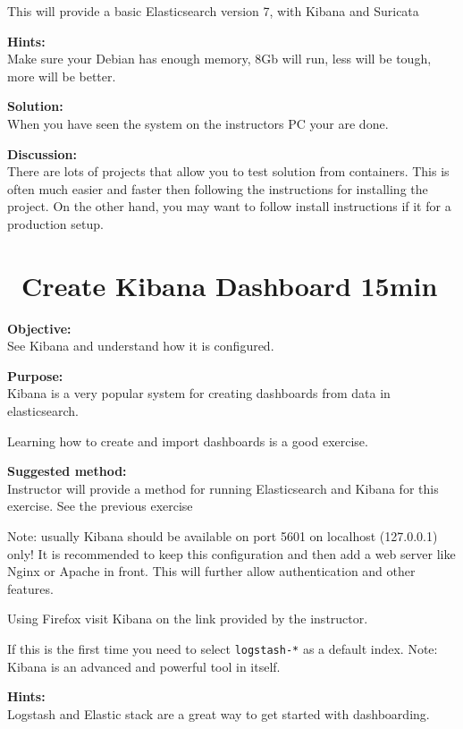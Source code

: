 \documentclass[a4paper,11pt,notitlepage]{report}
\begin{document}
This will provide a basic Elasticsearch version 7, with Kibana and Suricata


{\bf Hints:}\\
Make sure your Debian has enough memory, 8Gb will run, less will be tough, more will be better.

{\bf Solution:}\\
When you have seen the system on the instructors PC your are done.

{\bf Discussion:}\\
There are lots of projects that allow you to test solution from containers. This is often much easier and faster then following the instructions for installing the project.
On the other hand, you may want to follow install instructions if it for a production setup.

\chapter{\faInfoCircle\ Create Kibana Dashboard 15min}
\label{ex:kibana-dashboard}


{\bf Objective:}\\
See Kibana and understand how it is configured.

{\bf Purpose:}\\
Kibana is a very popular system for creating dashboards from data in elasticsearch.

Learning how to create and import dashboards is a good exercise.

{\bf Suggested method:}\\
Instructor will provide a method for running Elasticsearch and Kibana for this exercise. See the previous exercise \smiley

Note: usually Kibana should be available on port 5601 on localhost (127.0.0.1) only! It is recommended to keep this configuration and then add a web server like Nginx or Apache in front. This will further allow authentication and other features.

Using Firefox visit Kibana on the link provided by the instructor.

If this is the first time you need to
 select \verb+logstash-*+ as a default index. Note: Kibana is an advanced and powerful tool in itself.


{\bf Hints:}\\
Logstash and Elastic stack are a great way to get started with dashboarding.
\end{document}
